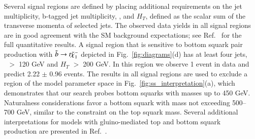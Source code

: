 Several signal regions are defined by placing additional requirements on the jet multiplicity, b-tagged jet multiplicity, 
\met, and $H_T$, defined as the scalar sum of the transverse momenta of selected jets. 
The observed data yields in all signal regions are in good agreement with the SM background expectations;
see Ref.~\cite{ref:ss} for the full quantitative results. A signal region that is sensitive to 
bottom squark pair production with $\tilde{b}\to t \tilde{\chi}_{1}^{-}$ depicted in Fig.~\ref{fig:diagrams}(d) 
has at least four jets, \met\ $>$ 120 GeV and
$H_T$ $>$ 200 GeV. In this region we observe 1 event in data and predict 2.22 $\pm$ 0.96 events.
The results in all signal regions are used to exclude a region of the model parameter space in Fig.~\ref{fig:ss_interpretation}(a),
which demonstrates that our search probes bottom squarks with masses up to 450 GeV.
Naturalness considerations favor a bottom squark with mass not exceeding 500--700 GeV, similar to the constraint
on the top squark mass.
Several additional interpretations for models with gluino-mediated top and 
bottom squark production are presented in Ref.~\cite{ref:ss}.

%



